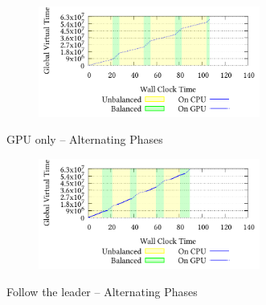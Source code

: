 \documentclass[8pt]{article}
\begin{document}
\setcounter{figure}{1}
\renewcommand{\thefigure}{\arabic{figure}f}
\begin{figure}[!h]
\centering
\begin{subfigure}[b]{\mysize}
\centering
\includegraphics[width=0.8\textwidth]{figures_original/alternating/2.processed.pdf}
\renewcommand{\thesubfigure}{Original}
\caption{}
\end{subfigure}
\begin{subfigure}[b]{\mysize}
\centering
{}
\renewcommand{\thesubfigure}{Reproduced}
\caption{}
\end{subfigure}
\caption{GPU only – Alternating Phases}
\end{figure}



\setcounter{figure}{1}
\renewcommand{\thefigure}{\arabic{figure}i}
\begin{figure}[!h]
\centering
\begin{subfigure}[b]{\mysize}
\centering
\includegraphics[width=0.8\textwidth]{figures_original/alternating/3.processed.pdf}
\renewcommand{\thesubfigure}{Original}
\caption{}
\end{subfigure}
\begin{subfigure}[b]{\mysize}
\centering
{}
\renewcommand{\thesubfigure}{Reproduced}
\caption{}
\end{subfigure}
\caption{Follow the leader – Alternating Phases}
\end{figure}
\end{document}

